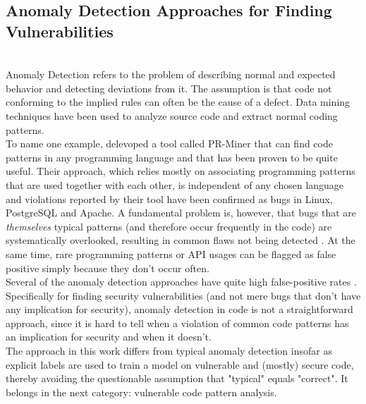 \documentclass[
	a4paper,
	pagesize,
	pdftex,
	12pt,
	twoside, %
	BCOR=5mm, %
	ngerman,
	fleqn,
	final,
	]{scrartcl}
\begin{document}
\subsection{Anomaly Detection Approaches for Finding Vulnerabilities}\mbox{}\\
Anomaly Detection refers to the problem of describing normal and expected behavior and detecting deviations from it. The assumption is that code not conforming to the implied rules can often be the cause of a defect. Data mining techniques have been used to analyze source code and extract normal coding patterns.\\
To name one example, \cite{Li.2005} delevoped a tool called PR-Miner that can find code patterns in any programming language and that has been proven to be quite useful. Their approach, which relies mostly on associating programming patterns that are used together with each other, is independent of any chosen language and violations reported by their tool have been confirmed as bugs in Linux, PostgreSQL and Apache. A fundamental problem is, however, that bugs that are \textit{themselves} typical patterns (and therefore occur frequently in the code) are systematically overlooked, resulting in common flaws not being detected \cite{Yamaguchi.2012}. At the same time, rare programming patterns or API usages can be flagged as false positive simply because they don't occur often.\\
Several of the anomaly detection approaches have quite high false-positive rates \citep{Ghaffarian.2017}. Specifically for finding security vulnerabilities (and not mere bugs that don't have any implication for security), anomaly detection in code is not a straightforward approach, since it is hard to tell when a violation of common code patterns has an implication for security and when it doesn't.\\
The approach in this work differs from typical anomaly detection insofar as explicit labels are used to train a model on vulnerable and (mostly) secure code, thereby avoiding the questionable assumption that "typical" equals "correct". It belongs in the next category: vulnerable code pattern analysis. 
\end{document}
